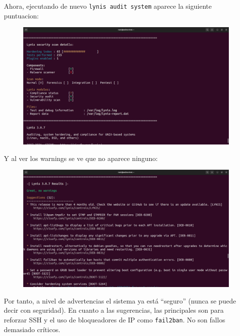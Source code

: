 \documentclass{article}
\begin{document}
Ahora, ejecutando de nuevo \verb|lynis audit system| aparece la siguiente puntuacion:

\begin{figure}[H]
    \includegraphics[width=\textwidth]{imagenes/lynisresults2.png}
\end{figure}

Y al ver los warnings se ve que no aparece ninguno:

\begin{figure}[H]
    \includegraphics[width=\textwidth]{imagenes/lyniswarnings2.png}
\end{figure}

Por tanto, a nivel de advertencias el sistema ya está ``seguro'' (nunca se puede decir con seguridad). En cuanto a las sugerencias, las principales son para reforzar SSH y el uso de bloqueadores de IP como \verb|fail2ban|. No son fallos demasiado críticos.
\end{document}
